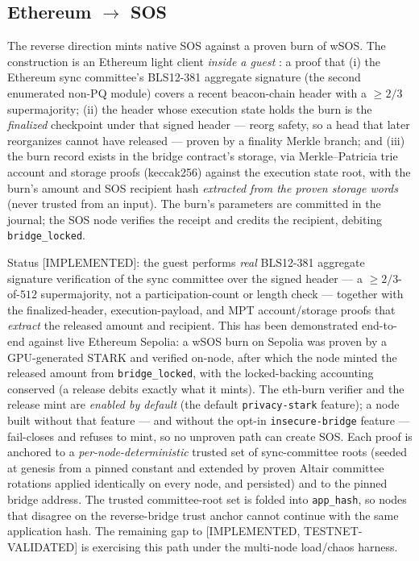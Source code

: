 \documentclass[11pt]{article}
\newcommand{\code}[1]{\texttt{#1}}
\newcommand{\statusI}{\textcolor{statgreen}{\textsf{\scriptsize[IMPLEMENTED]}}}
\newcommand{\statusV}{\textcolor{statgreen}{\textsf{\scriptsize[IMPLEMENTED, TESTNET-VALIDATED]}}}
\theoremstyle{plain}
\theoremstyle{definition}
\theoremstyle{remark}
\begin{document}
\subsection{Ethereum $\to$ SOS}
\label{sec:eth-to-sos}

The reverse direction mints native SOS against a proven burn of wSOS. The
construction is an Ethereum light client \emph{inside a guest}
\cite{altair2021}: a proof that (i) the Ethereum sync committee's BLS12-381
aggregate signature (the second enumerated non-PQ module) covers a recent
beacon-chain header with a $\ge 2/3$ supermajority; (ii) the header whose
execution state holds the burn is the \emph{finalized} checkpoint under that
signed header --- reorg safety, so a head that later reorganizes cannot have
released --- proven by a finality Merkle branch; and (iii) the burn record
exists in the bridge contract's storage, via Merkle--Patricia trie account and
storage proofs (keccak256) against the execution state root, with the burn's
amount and SOS recipient hash \emph{extracted from the proven storage words}
(never trusted from an input). The burn's parameters are committed in the
journal; the SOS node verifies the receipt and credits the recipient, debiting
\code{bridge\_locked}.

Status \statusI{}: the guest performs \emph{real} BLS12-381 aggregate
signature verification of the sync committee over the signed header --- a
$\ge 2/3$-of-$512$ supermajority, not a participation-count or length check ---
together with the finalized-header, execution-payload, and MPT account/storage
proofs that \emph{extract} the released amount and recipient. This has been
demonstrated end-to-end against live Ethereum Sepolia: a wSOS burn on Sepolia
was proven by a GPU-generated STARK and verified on-node, after which the node
minted the released amount from \code{bridge\_locked}, with the locked-backing
accounting conserved (a release debits exactly what it mints). The eth-burn
verifier and the release mint are \emph{enabled by default} (the default
\code{privacy-stark} feature); a node built without that feature --- and
without the opt-in \code{insecure-bridge} feature --- fail-closes and refuses
to mint, so no unproven path can create SOS. Each proof is anchored to a
\emph{per-node-deterministic} trusted set of sync-committee roots (seeded at
genesis from a pinned constant and extended by proven Altair committee
rotations applied identically on every node, and persisted) and to the pinned
bridge address. The trusted committee-root set is folded into
\code{app\_hash}, so nodes that disagree on the reverse-bridge trust anchor
cannot continue with the same application hash. The remaining gap to
\statusV{} is exercising this path under the multi-node load/chaos harness.
\end{document}
